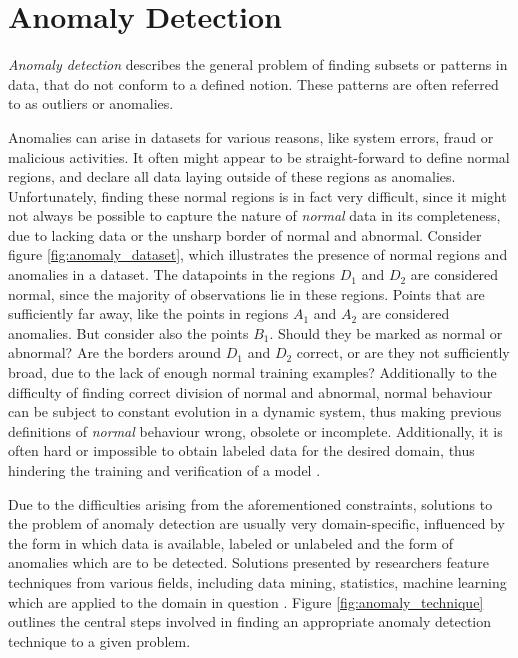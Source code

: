 \section{Anomaly Detection \label{sec:anomaly-detection}}
\textit{Anomaly detection} describes the general problem of finding subsets or patterns in data, that do not conform to a defined notion. These patterns are often referred to as outliers or anomalies.

Anomalies can arise in datasets for various reasons, like system errors, fraud or malicious activities. It often might appear to be straight-forward to define normal regions, and declare all data laying outside of these regions as anomalies. Unfortunately, finding these normal regions is in fact very difficult, since it might not always be possible to capture the nature of \textit{normal} data in its completeness, due to lacking data or the unsharp border of normal and abnormal. Consider figure \ref{fig:anomaly_dataset}, which illustrates the presence of normal regions and anomalies in a dataset. The datapoints in the regions $D_1$ and $D_2$ are considered normal, since the majority of observations lie in these regions. Points that are sufficiently far away, like the points in regions $A_1$ and $A_2$ are considered anomalies. But consider also the points $B_1$. Should they be marked as normal or abnormal? Are the borders around $D_1$ and $D_2$ correct, or are they not sufficiently broad, due to the lack of enough normal training examples? 
Additionally to the difficulty of finding correct division of normal and abnormal, normal behaviour can be subject to constant evolution in a dynamic system, thus making previous definitions of \textit{normal} behaviour wrong, obsolete or incomplete. Additionally, it is often hard or impossible to obtain labeled data for the desired domain, thus hindering the training and verification of a model \cite{chandola2009anomaly}.

Due to the difficulties arising from the aforementioned constraints, solutions to the problem of anomaly detection are usually very domain-specific, influenced by the form in which data is available, labeled or unlabeled and the form of anomalies which are to be detected. Solutions presented by researchers feature techniques from various fields, including data mining, statistics, machine learning which are applied to the domain in question \cite{chandola2009anomaly}. Figure \ref{fig:anomaly_technique} outlines the central steps involved in finding an appropriate anomaly detection technique to a given problem.


